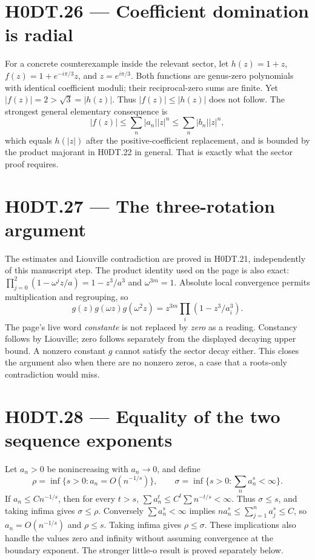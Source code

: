 \section*{H0DT.26 --- Coefficient domination is radial}
For a concrete counterexample inside the relevant sector, let $h(z)=1+z$, $f(z)=1+e^{-i\pi/3}z$, and $z=e^{i\pi/3}$. Both functions are genus-zero polynomials with identical coefficient moduli; their reciprocal-zero sums are finite. Yet $|f(z)|=2>\sqrt3=|h(z)|$. Thus $|f(z)|\le|h(z)|$ does not follow. The strongest general elementary consequence is
\[
 |f(z)|\le\sum_n|a_n||z|^n\le\sum_n|b_n||z|^n,
\]
which equals $h(|z|)$ after the positive-coefficient replacement, and is bounded by the product majorant in H0DT.22 in general. That is exactly what the sector proof requires.

\section*{H0DT.27 --- The three-rotation argument}
The estimates and Liouville contradiction are proved in H0DT.21, independently of this manuscript step. The product identity used on the page is also exact: $\prod_{j=0}^2(1-\omega^jz/a)=1-z^3/a^3$ and $\omega^{3m}=1$. Absolute local convergence permits multiplication and regrouping, so
\[
 g(z)g(\omega z)g(\omega^2z)=z^{3m}\prod_i(1-z^3/a_i^3).
\]
The page's live word \emph{constante} is not replaced by \emph{zero} as a reading. Constancy follows by Liouville; zero follows separately from the displayed decaying upper bound. A nonzero constant $g$ cannot satisfy the sector decay either. This closes the argument also when there are no nonzero zeros, a case that a roots-only contradiction would miss.

\section*{H0DT.28 --- Equality of the two sequence exponents}
Let $a_n>0$ be nonincreasing with $a_n\to0$, and define
\[
 \rho=\inf\{s>0:a_n=O(n^{-1/s})\},\qquad
 \sigma=\inf\{s>0:\sum_n a_n^s<\infty\}.
\]
If $a_n\le C n^{-1/s}$, then for every $t>s$, $\sum a_n^t\le C^t\sum n^{-t/s}<\infty$. Thus $\sigma\le s$, and taking infima gives $\sigma\le\rho$. Conversely $\sum a_n^s<\infty$ implies $n a_n^s\le\sum_{j=1}^n a_j^s\le C$, so $a_n=O(n^{-1/s})$ and $\rho\le s$. Taking infima gives $\rho\le\sigma$. These implications also handle the values zero and infinity without assuming convergence at the boundary exponent. The stronger little-o result is proved separately below.


